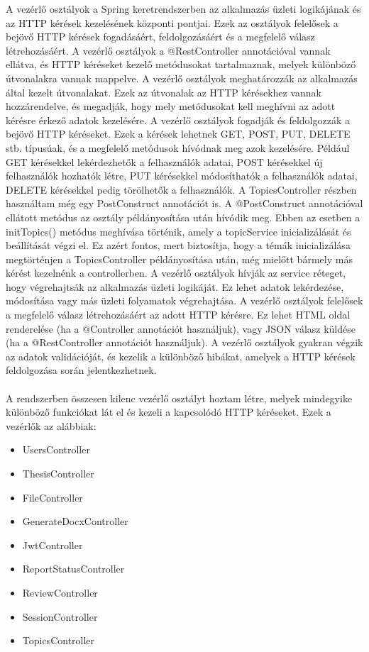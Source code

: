 A vezérlő osztályok a Spring keretrendszerben az alkalmazás üzleti logikájának és az HTTP kérések kezelésének központi pontjai. Ezek az osztályok felelősek a bejövő HTTP kérések fogadásáért, feldolgozásáért és a megfelelő válasz létrehozásáért. A vezérlő osztályok a @RestController annotációval vannak ellátva, és HTTP kéréseket kezelő metódusokat tartalmaznak, melyek különböző útvonalakra vannak mappelve. A vezérlő osztályok meghatározzák az alkalmazás által kezelt útvonalakat. Ezek az útvonalak az HTTP kérésekhez vannak hozzárendelve, és megadják, hogy mely metódusokat kell meghívni az adott kérésre érkező adatok kezelésére. A vezérlő osztályok fogadják és feldolgozzák a bejövő HTTP kéréseket. Ezek a kérések lehetnek GET, POST, PUT, DELETE stb. típusúak, és a megfelelő metódusok hívódnak meg azok kezelésére. Például GET kérésekkel lekérdezhetők a felhasználók adatai, POST kérésekkel új felhasználók hozhatók létre, PUT kérésekkel módosíthatók a felhasználók adatai, DELETE kérésekkel pedig törölhetők a felhasználók. A TopicsController részben használtam még egy PostConstruct annotációt is. A @PostConstruct annotációval ellátott metódus az osztály példányosítása után hívódik meg. Ebben az esetben a initTopics() metódus meghívása történik, amely a topicService inicializálását és beállítását végzi el. Ez azért fontos, mert biztosítja, hogy a témák inicializálása megtörténjen a TopicsController példányosítása után, még mielőtt bármely más kérést kezelnénk a controllerben. A vezérlő osztályok hívják az service réteget, hogy végrehajtsák az alkalmazás üzleti logikáját. Ez lehet adatok lekérdezése, módosítása vagy más üzleti folyamatok végrehajtása. A vezérlő osztályok felelősek a megfelelő válasz létrehozásáért az adott HTTP kérésre. Ez lehet HTML oldal renderelése (ha a @Controller annotációt használjuk), vagy JSON válasz küldése (ha a @RestController annotációt használjuk). A vezérlő osztályok gyakran végzik az adatok validációját, és kezelik a különböző hibákat, amelyek a HTTP kérések feldolgozása során jelentkezhetnek.\\
\\
A rendszerben összesen kilenc vezérlő osztályt hoztam létre, melyek mindegyike különböző funkciókat lát el és kezeli a kapcsolódó HTTP kéréseket. Ezek a vezérlők az alábbiak:
\begin{itemize}

\item{UsersController}
\item{ThesisController}
\item{FileController}
\item{GenerateDocxController}
\item{JwtController}
\item{ReportStatusController}
\item{ReviewController}
\item{SessionController}
\item{TopicsController}

\end{itemize}

